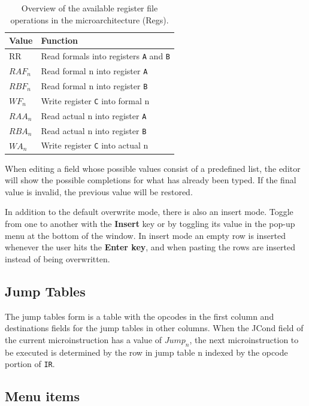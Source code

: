 \documentclass{article}
\begin{document}
\begin{table}
\begin{tabular}{l|l}
Value	& Function \\
\hline
RR	& Read formals into registers \texttt{A} and \texttt{B} \\
$RAF_{n}$	& Read formal n into register \texttt{A} \\
$RBF_{n}$	& Read formal n into register \texttt{B} \\
$WF_{n}$	& Write register \texttt{C} into formal n \\
$RAA_{n}$	& Read actual n into register \texttt{A} \\
$RBA_{n}$	& Read actual n into register \texttt{B} \\
$WA_{n}$	& Write register \texttt{C} into actual n
\end{tabular}
\caption{Overview of the available register file operations in the microarchitecture (Regs).}
\label{table:regs}
\end{table}

When editing a field whose possible values consist of a predefined list,
the editor will show the possible completions for what has already been
typed. If the final value is invalid, the previous value will be restored.

In addition to the default overwrite mode, there is also an insert mode. Toggle from one to another with the \textbf{Insert} key
or by toggling its value in the pop-up menu at the bottom of the window. In insert mode an empty row is inserted whenever
the user hits the \textbf{Enter key}, and when pasting the rows are inserted instead of being overwritten.

\subsection{Jump Tables}
The jump tables form is a table with the opcodes in the first column and
 destinations fields for the jump tables in other columns. When the 
JCond field of the current microinstruction has a value of $Jump_{n}$, the next microinstruction to be executed is determined by the row in jump table n indexed by the opcode portion of \texttt{IR}. 

\subsection{Menu items}
\end{document}
